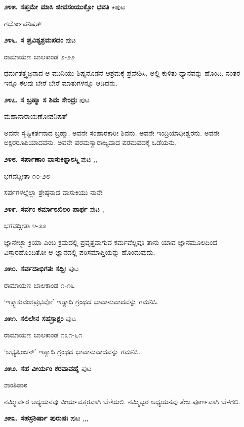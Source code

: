 {\medskip
\noindent\textbf{೨೪೫. ಸಪ್ತಮೇ ಮಾಸಿ ಜೀವಸಂಯುಕ್ತೋ ಭವತಿ} $\star$\hfill ಪುಟ \pageref{85}

\hfill ಗರ್ಭೋಪನಿಷತ್

\medskip
\noindent\textbf{೨೪೬. ಸ ಪ್ರವಿಶ್ಯಶ್ರಮಪದಂ} \hfill ಪುಟ \pageref{201}

\hfill ರಾಮಾಯಣ ಬಾಲಕಾಂಡ ೨-೨೨

ಧರ್ಮತತ್ತ್ವಜ್ಞನಾದ ಆ ಮುನಿಯು ಶಿಷ್ಯನೊಡನೆ ಆಶ್ರಮಕ್ಕೆ ಪ್ರವೇಶಿಸಿ, ಅಲ್ಲಿ ಕುಳಿತು ಧ್ಯಾನವನ್ನು ಹೊಂದಿ, ನಂತರ ಇನ್ನೂ ಕೆಲವು ಬೇರೆ ಬೇರೆ ಮಾತುಗಳನ್ನೂ ಆಡಿದನು.

\medskip
\noindent\textbf{೨೪೭. ಸ ಬ್ರಹ್ಮಾ ಸ ಶಿವಃ ಸೇಂದ್ರಃ} \hfill ಪುಟ \pageref{249}

\hfill ಮಹಾನಾರಾಯಣೋಪನಿಷತ್

ಅವನೇ ಸೃಷ್ಟಿಕರ್ತನಾದ ಬ್ರಹ್ಮಾ. ಅವನೇ ಸಂಹಾರಕಾರೀ ಶಿವನು. ಅವನೇ ಇಂದ್ರಿಯಾಧೀಶ್ವರನು. ಅವನೇ ಅಕ್ಷರರೂಪಿಯಾದವನು. ಅವನೇ ಪರಮಸ್ವಾರಾಜ್ಯವಾದ ಪರಮಪದಕ್ಕೆ ಒಡೆಯನು. 

\medskip
\noindent\textbf{೨೪೮. ಸರ್ಪಾಣಾಂ ವಾಸುಕಿಶ್ಚಾಽಸ್ಮಿ} \hfill ಪುಟ \pageref{93},\pageref{95},\pageref{98}

\hfill ಭಗವದ್ಗೀತಾ ೧೦-೨೮

ಸರ್ಪಗಳಲ್ಲೆಲ್ಲಾ ಶ್ರೇಷ್ಠನಾದ ವಾಸುಕಿಯು ನಾನೇ

\medskip
\noindent\textbf{೨೪೯. ಸರ್ವಂ ಕರ್ಮಾಽಖಿಲಂ ಪಾರ್ಥ} \hfill ಪುಟ \pageref{98},\pageref{78}

\hfill ಭಗವದ್ಗೀತಾ ೪-೨೨

ಜ್ಞಾನೇಚ್ಛಾ ಕ್ರಿಯಾ ಎಂಬ ಕ್ರಮದಲ್ಲಿ ಪ್ರವೃತ್ತವಾಗುವ ಕರ್ಮವೆಲ್ಲವೂ ತಾನು ಯಾವ ಜ್ಞಾನಮೂಲದಿಂದ ವಿಸ್ತಾರಹೊಂದಿತೋ ಆ ಜ್ಞಾನದಲ್ಲಿ ಪರಿಸಮಾಪ್ತಿಯನ್ನು ಹೊಂದುವುದು.

\medskip
\noindent\textbf{೨೫೦. ಸರ್ವದಾಭಿಗತಃ ಸದ್ಭಿಃ} \hfill ಪುಟ \pageref{247}

\hfill ರಾಮಾಯಣ ಬಾಲಕಾಂಡ ೧-೧೬

`ಇಕ್ಷ್ವಾಕುವಂಶಪ್ರಭವೋ' ಇತ್ಯಾದಿ ಗ್ರಂಥದ ಭಾವಾನುವಾದವನ್ನು ಗಮನಿಸಿ.

\medskip
\noindent\textbf{೨೫೧. ಸಲಿಲೇನ ಸಹಸ್ರಾಕ್ಷಂ} \hfill ಪುಟ \pageref{248}

\hfill ರಾಮಾಯಣ ಬಾಲಕಾಂಡ ೧೩೧-೬೧

`ಅಭ್ಯಷಿಂಚನ್' ಇತ್ಯಾದಿ ಗ್ರಂಥದ ಭಾವಾನುವಾದವನ್ನು ಗಮನಿಸಿ.

\medskip
\noindent\textbf{೨೫೨. ಸಹ ವೀರ್ಯಂ ಕರವಾವಹೈ} \hfill ಪುಟ \pageref{130}

\hfill ಶಾಂತಿಪಾಠ

ನಮ್ಮೀರ್ವರ ಅಧ್ಯಯನವು ವೀರ್ಯವತ್ತರವಾಗಿ ಬೆಳೆಯಲಿ. ನಮ್ಮಿಬ್ಬರ ಅಧ್ಯಯನವು ತೇಜಃಪೂರ್ಣವಾಗಿ ಬೆಳಗಲಿ.

\medskip
\noindent\textbf{೨೫೩. ಸಹಸ್ರಶಿರ್ಷಾ ಪುರುಷಃ} \hfill ಪುಟ \pageref{108},\pageref{150},\pageref{218},\pageref{249}

}
